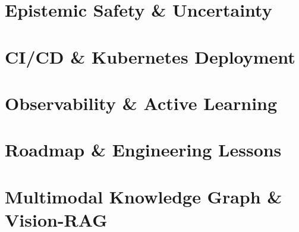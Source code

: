 \documentclass[aspectratio=169]{beamer}
\begin{document}
\section{Epistemic Safety \& Uncertainty}


\section{CI/CD \& Kubernetes Deployment}


\section{Observability \& Active Learning}


\section{Roadmap \& Engineering Lessons}


\section{Multimodal Knowledge Graph \& Vision-RAG}

\end{document}
